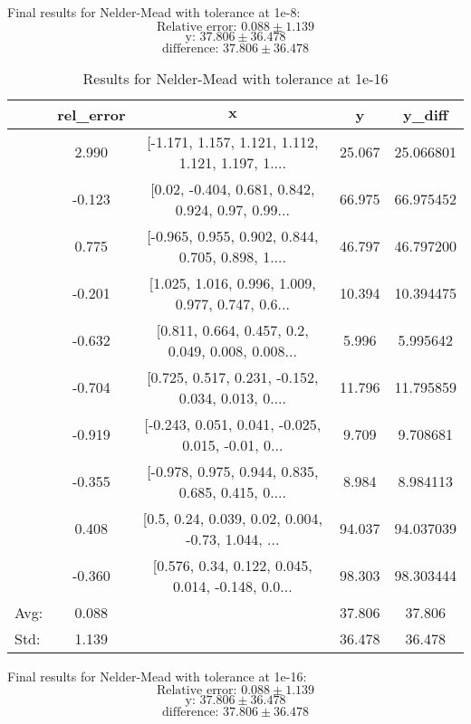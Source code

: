 \documentclass[10pt,onside]{article}
\begin{document}
\begin{description}
Final results for Nelder-Mead with tolerance at 1e-8:\\
$$\text{Relative error: } 0.088 \pm 1.139$$
$$\text{y: } 37.806 \pm 36.478$$
$$\text{difference: } 37.806 \pm 36.478$$

\pagebreak

\begin{table}[h]
\centering
\caption{Results for Nelder-Mead with tolerance at 1e-16}
\begin{tabular}{lcccc}
\toprule
{} &  rel\_error &  $\mathbf{x}$ &       y &     y\_diff \\
\midrule
&      2.990 &  [-1.171, 1.157, 1.121, 1.112, 1.121, 1.197, 1.... &  25.067 &  25.066801 \\
&     -0.123 &  [0.02, -0.404, 0.681, 0.842, 0.924, 0.97, 0.99... &  66.975 &  66.975452 \\
&      0.775 &  [-0.965, 0.955, 0.902, 0.844, 0.705, 0.898, 1.... &  46.797 &  46.797200 \\
&     -0.201 &  [1.025, 1.016, 0.996, 1.009, 0.977, 0.747, 0.6... &  10.394 &  10.394475 \\
&     -0.632 &  [0.811, 0.664, 0.457, 0.2, 0.049, 0.008, 0.008... &   5.996 &   5.995642 \\
&     -0.704 &  [0.725, 0.517, 0.231, -0.152, 0.034, 0.013, 0.... &  11.796 &  11.795859 \\
&     -0.919 &  [-0.243, 0.051, 0.041, -0.025, 0.015, -0.01, 0... &   9.709 &   9.708681 \\
&     -0.355 &  [-0.978, 0.975, 0.944, 0.835, 0.685, 0.415, 0.... &   8.984 &   8.984113 \\
&      0.408 &  [0.5, 0.24, 0.039, 0.02, 0.004, -0.73, 1.044, ... &  94.037 &  94.037039 \\
&     -0.360 &  [0.576, 0.34, 0.122, 0.045, 0.014, -0.148, 0.0... &  98.303 &  98.303444 \\
\bottomrule
Avg: & 0.088 &  & 37.806 & 37.806 \\
Std: & 1.139 &  & 36.478 & 36.478 \\
\bottomrule
\end{tabular}
\end{table}

Final results for Nelder-Mead with tolerance at 1e-16:\\
$$\text{Relative error: } 0.088 \pm 1.139$$
$$\text{y: } 37.806 \pm 36.478$$
$$\text{difference: } 37.806 \pm 36.478$$



\end{description}
\end{document}
